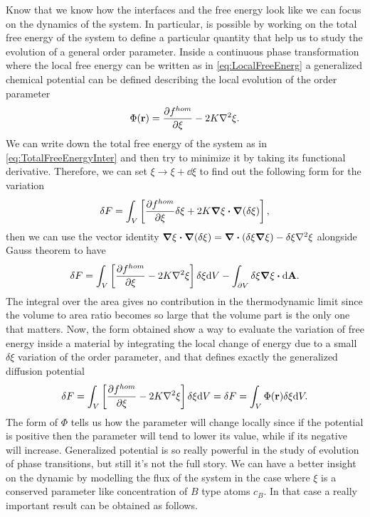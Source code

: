 Know that we know how the interfaces and the free energy look like we can focus on the dynamics of the system. In particular, is possible by working on the total free energy of the system to define a particular quantity that help us to study the evolution of a general order parameter.
{
    Inside a continuous phase transformation where the local free energy can be written as in \eqref{eq:LocalFreeEnerg} a generalized chemical potential can be defined describing the local evolution of the order parameter
    \begin{equation}
        \Phi(\vb{r}) = \pdv{f^{hom}}{\xi} - 2K\laplacian \xi.
    \end{equation}
}
{
    We can write down the total free energy of the system as in \eqref{eq:TotalFreeEnergyInter} and then try to minimize it by taking its functional derivative. Therefore, we can set $\xi \to \xi + \dd \xi$ to find out the following form for the variation
    \begin{equation}
        \delta F = \int_V \left[ \pdv{f^{hom}}{\xi}\delta\xi + 2K\grad\xi\vdot \grad(\delta\xi) \right],
    \end{equation}
    then we can use the vector identity $\grad\xi\vdot \grad(\delta\xi) = \grad\vdot(\delta\xi\grad\xi) - \delta\xi\laplacian\xi$ alongside Gauss theorem to have
    \begin{equation}
        \delta F  = \int_V\left[ \pdv{f^{hom}}{\xi} - 2K\laplacian \xi\right]\delta \xi\dd V - \int_{\partial V} \delta\xi\grad\xi\vdot \dd \vb{A}.
    \end{equation}
    The integral over the area gives no contribution in the thermodynamic limit since the volume to area ratio becomes so large that the volume part is the only one that matters. Now, the form obtained show a way to evaluate the variation of free energy inside a material by integrating the local change of energy due to a small $\delta \xi$ variation of the order parameter, and that defines exactly the generalized diffusion potential
    \begin{equation}
        \delta F  = \int_V\left[ \pdv{f^{hom}}{\xi} - 2K\laplacian \xi\right]\delta \xi\dd V = \delta F  = \int_V\Phi(\vb{r})\delta \xi\dd V.
    \end{equation}
}
\noindent
The form of $\Phi$ tells us how the parameter will change locally since if the potential is positive then the parameter will tend to lower its value, while if its negative will increase. Generalized potential is so really powerful in the study of evolution of phase transitions, but still it's not the full story. We can have a better insight on the dynamic by modelling the flux of the system in the case where $\xi$ is a conserved parameter like concentration of $B$ type atoms $c_B$. In that case a really important result can be obtained as follows.
